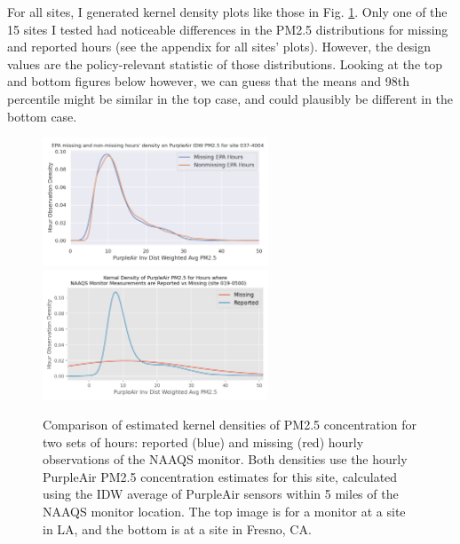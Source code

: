 \documentclass[12pt]{article}
\begin{document}
 For all sites, I generated kernel density plots like those in Fig. \ref{fig:missing-density_019-0500}. Only one of the 15 sites I tested had noticeable differences in the PM2.5 distributions for missing and reported hours (see the appendix for all sites' plots). However, the design values are the policy-relevant statistic of those distributions. Looking at the top and bottom figures below however, we can guess that the means and 98th percentile might be similar in the top case, and could plausibly be different in the bottom case.

 
\begin{figure}
\centering
\includegraphics[width=0.6\textwidth]{site-037-4004_epa-pa-missing-density.png}
\includegraphics[width=0.6\textwidth]{appendix/site_plots/site-019-0500_epa-pa-missing-density.png}
\caption{Comparison of estimated kernel densities of PM2.5 concentration for two sets of hours: reported (blue) and missing (red) hourly observations of the NAAQS monitor. Both densities use the hourly PurpleAir PM2.5 concentration estimates for this site, calculated using the IDW average of PurpleAir sensors within 5 miles of the NAAQS monitor location. The top image is for a monitor at a site in LA, and the bottom is at a site in Fresno, CA.}
\label{fig:missing-density_019-0500}
\end{figure}
\end{document}
